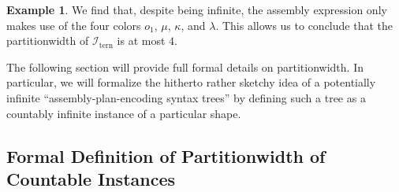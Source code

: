 \documentclass[10pt,a4paper]{amsart}
\theoremstyle{definition}
\newtheorem{exa}[exa]{Example}
\numberwithin{equation}{section}
\theoremstyle{plain}
\theoremstyle{definition}
\newtheorem{example}[example]{Example}
\theoremstyle{myexample}
\renewenvironment{example}%
{
	\begin{shaded*}	
		\vspace{-1.5ex}
		\begin{exa}%
		}{
		\end{exa}
		\vspace{-1.5ex}
	\end{shaded*}
}
\theoremstyle{plain}
\theoremstyle{definition}
\newcommand{\instance}{\mathcal{I}}
\newcommand{\inst}{\instance}
\newcommand{\origcol}{o}
\newcommand{\cols}{\mathbb{L}}
\newcommand{\cadd}[4]{#4\pred{\texttt{-}Add}^{#3}_{#1#2}} %
\newcommand{\radd}[4]{#4\pred{\texttt{-}Add}^{#3}_{#1#2}}
\newcommand{\recol}[2]{#2\pred{\texttt{-}ReCol}_{#1}}
\newcommand{\Partitionwidth}{Par\-ti\-tion\-width}
\newcommand{\pred}[1]{\mathtt{#1}}
\newcommand{\rpred}{\pred{R}}
\newcommand{\dfn}{Def.} %
\newcommand{\fig}{Fig.} %
\begin{document}
\begin{example}

We find that, despite being infinite, the assembly expression only makes use of the four colors $o_1$, $\mu$, $\kappa$, and $\lambda$. This allows us to conclude that the partitionwidth of   
$\inst_\mathrm{tern}$ is at most $4$.
\end{example}

 
The following section will provide full formal details on partitionwidth. In particular, we will formalize the hitherto rather sketchy idea of a potentially infinite ``assembly-plan-encoding syntax trees'' by defining such a tree as a countably infinite instance of a particular shape. 


\subsection{Formal Definition of \Partitionwidth{} of Countable Instances}\label{sec:cwdef}


\newcommand{\szero}{\pred{Succ}_0}
\newcommand{\sone}{\pred{Succ}_1}
\newcommand{\ibtree}{\mathcal{T}_\mathrm{bin}}
\newcommand{\colconsig}{(\cols, \mathrm{Cnst}, \Sigma)}
\newcommand{\decorum}{\mathrm{Dec}\colconsig}
\newcommand{\predupdate}[1]{\pred{#1}}
\newcommand{\instructionset}{\mathrm{Instr}(\cols, \Sigma)}
\newcommand{\instruction}{\mathrm{Instr}}
\newcommand{\instr}{\instruction}
\end{document}
